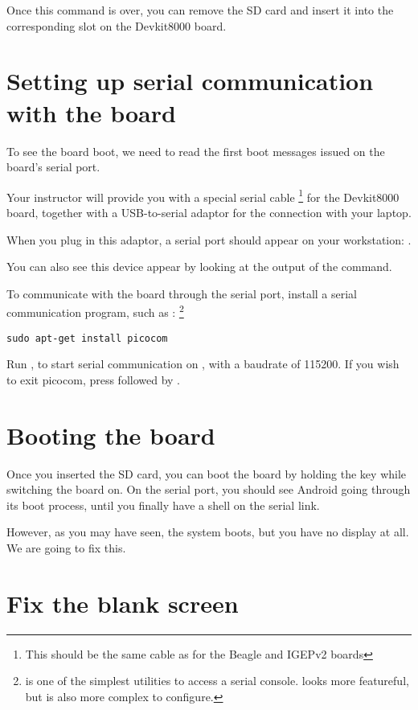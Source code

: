 Once this command is over, you can remove the SD card and insert it
into the corresponding slot on the Devkit8000 board.

\section{Setting up serial communication with the board}

To see the board boot, we need to read the first boot messages 
issued on the board's serial port.

Your instructor will provide you with a special serial cable
\footnote{This should be the same cable as for the Beagle and IGEPv2 boards}
for the Devkit8000 board, together with a USB-to-serial adaptor for the connection
with your laptop.

When you plug in this adaptor, a serial port should appear on your workstation:
.

You can also see this device appear by looking at the output of the 
command.

To communicate with the board through the serial port, install a
serial communication program, such as :
\footnote{ is one of the simplest utilities to access
a serial console.  looks more featureful, but is also
more complex to configure.}

\begin{verbatim}
sudo apt-get install picocom
\end{verbatim}

Run , to start serial
communication on , with a baudrate of 115200. If
you wish to exit picocom, press \code{[Ctrl][a]} followed by
\code{[Ctrl][x]}.

\section{Booting the board}

Once you inserted the SD card, you can boot the board by 
holding the  key while switching the board on. On the
serial port, you should see Android going through its boot process, until
you finally have a shell on the serial link.

However, as you may have seen, the system boots, but you have no display at
all. We are going to fix this.

\section{Fix the blank screen}


